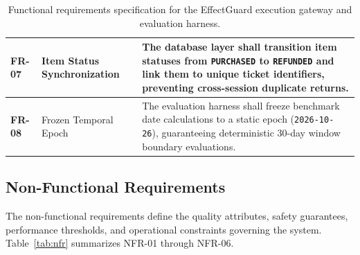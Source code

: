 \begin{table}[H]
\begin{tabular}{|p{1.4cm}|p{3.4cm}|p{8.5cm}|}
\hline
\textbf{FR-07} & Item Status Synchronization & The database layer shall transition item statuses from \texttt{PURCHASED} to \texttt{REFUNDED} and link them to unique ticket identifiers, preventing cross-session duplicate returns. \\
\hline
\textbf{FR-08} & Frozen Temporal Epoch & The evaluation harness shall freeze benchmark date calculations to a static epoch (\texttt{2026-10-26}), guaranteeing deterministic 30-day window boundary evaluations. \\
\hline
\end{tabular}
\caption{Functional requirements specification for the EffectGuard execution gateway and evaluation harness.}
\label{tab:fr}
\end{table}

\subsection{Non-Functional Requirements}

The non-functional requirements define the quality attributes, safety guarantees, performance thresholds, and operational constraints governing the system. Table~\ref{tab:nfr} summarizes NFR-01 through NFR-06.

